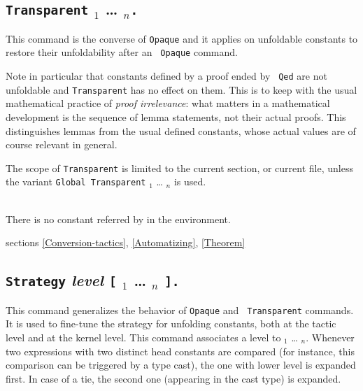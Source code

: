 \subsection[{\tt Transparent} \qualid$_1$ {\ldots} \qualid$_n${\tt .}]{{\tt Transparent} \qualid$_1$ {\ldots} \qualid$_n${\tt .}\label{Transparent}}
This command is the converse of {\tt Opaque} and it applies on
unfoldable constants to restore their unfoldability after an {\tt
Opaque} command.

Note in particular that constants defined by a proof ended by {\tt
Qed} are not unfoldable and {\tt Transparent} has no effect on
them. This is to keep with the usual mathematical practice of {\em
proof irrelevance}: what matters in a mathematical development is the
sequence of lemma statements, not their actual proofs. This
distinguishes lemmas from the usual defined constants, whose actual
values are of course relevant in general.

The scope of {\tt Transparent} is limited to the current section, or
current file, unless the variant {\tt Global Transparent} \qualid$_1$
{\ldots} \qualid$_n$ is used.

\begin{ErrMsgs}
\item {}\\
    There is no constant referred by {\qualid} in the environment.
\end{ErrMsgs}

\SeeAlso sections \ref{Conversion-tactics}, \ref{Automatizing},
\ref{Theorem}

\subsection{{\tt Strategy} {\it level} {\tt [} \qualid$_1$ {\ldots} \qualid$_n$
  {\tt ].}\label{Strategy}}
This command generalizes the behavior of {\tt Opaque} and {\tt
  Transparent} commands. It is used to fine-tune the strategy for
unfolding constants, both at the tactic level and at the kernel
level. This command associates a level to \qualid$_1$ {\ldots}
\qualid$_n$. Whenever two expressions with two distinct head
constants are compared (for instance, this comparison can be triggered
by a type cast), the one with lower level is expanded first. In case
of a tie, the second one (appearing in the cast type) is expanded.

